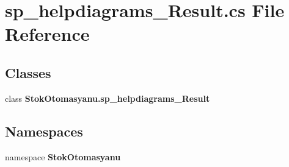\section{sp\+\_\+helpdiagrams\+\_\+\+Result.\+cs File Reference}
\label{sp__helpdiagrams___result_8cs}
\subsection*{Classes}
\begin{DoxyCompactItemize}
\item 
class \textbf{ Stok\+Otomasyanu.\+sp\+\_\+helpdiagrams\+\_\+\+Result}
\end{DoxyCompactItemize}
\subsection*{Namespaces}
\begin{DoxyCompactItemize}
\item 
namespace \textbf{ Stok\+Otomasyanu}
\end{DoxyCompactItemize}
